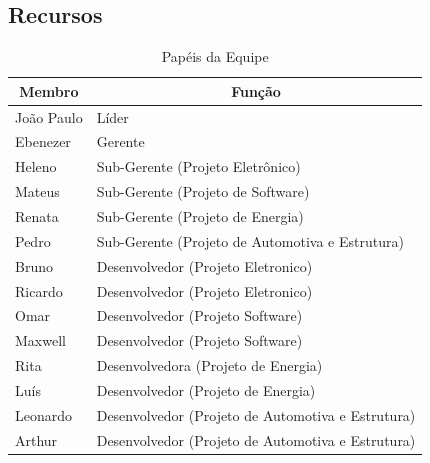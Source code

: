 \pagebreak

\subsection{Recursos}

\begin{table}[!htbp]
\centering
\caption{Papéis da Equipe}
\label{papeisDaEquipe}
\begin{tabular}{|l|l|}
\hline
\multicolumn{1}{|c|}{\textbf{Membro}} & \multicolumn{1}{c|}{\textbf{Função}}              \\ \hline
João Paulo                            & Líder                                             \\ \hline
Ebenezer                              & Gerente                                           \\ \hline
Heleno                                & Sub-Gerente (Projeto Eletrônico)                  \\ \hline
Mateus                                & Sub-Gerente (Projeto de Software)                 \\ \hline
Renata                                & Sub-Gerente (Projeto de Energia)                  \\ \hline
Pedro                                 & Sub-Gerente (Projeto de Automotiva e Estrutura)   \\ \hline
Bruno                                 & Desenvolvedor (Projeto Eletronico)                \\ \hline
Ricardo                               & Desenvolvedor (Projeto Eletronico)                \\ \hline
Omar                                  & Desenvolvedor (Projeto Software)                  \\ \hline
Maxwell                               & Desenvolvedor (Projeto Software)                  \\ \hline
Rita                                  & Desenvolvedora (Projeto de Energia)               \\ \hline
Luís                                  & Desenvolvedor (Projeto de Energia)                \\ \hline
Leonardo                              & Desenvolvedor (Projeto de Automotiva e Estrutura) \\ \hline
Arthur                                & Desenvolvedor (Projeto de Automotiva e Estrutura) \\ \hline
\end{tabular}
\end{table}


